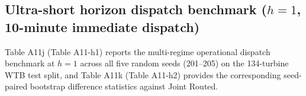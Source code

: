 \documentclass[
  journal]{IEEEtran}
\begin{document}
\FloatBarrier

\subsection*{\texorpdfstring{Ultra-short horizon dispatch benchmark
(\(h=1\), 10-minute immediate
dispatch)}{Ultra-short horizon dispatch benchmark (h=1, 10-minute immediate dispatch)}}\label{ultra-short-horizon-dispatch-benchmark-h1-10-minute-immediate-dispatch}

Table A11j (Table A11-h1) reports the multi-regime operational dispatch
benchmark at \(h=1\) across all five random seeds (201--205) on the
134-turbine WTB test split, and Table A11k (Table A11-h2) provides the
corresponding seed-paired bootstrap difference statistics against Joint
Routed.
\end{document}
